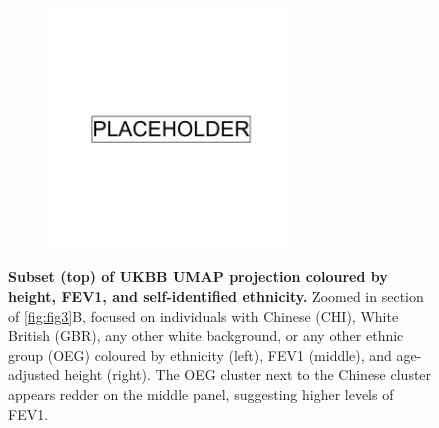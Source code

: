 \begin{figure}
    \centering
    \begin{subfigure}{\textwidth}
    \includegraphics[width=0.7\textwidth]{placeholder.png}
    \end{subfigure}
    \caption[Subset (top) of UKBB UMAP projection coloured by height, FEV1, and self-identified ethnicity]{\textbf{Subset (top) of UKBB UMAP projection coloured by height, FEV1, and self-identified ethnicity.} Zoomed in section of \ref{fig:fig3}B, focused on individuals with Chinese (CHI), White British (GBR), any other white background, or any other ethnic group (OEG) coloured by ethnicity (left), FEV1 (middle), and age-adjusted height (right). The OEG cluster next to the Chinese cluster appears redder on the middle panel, suggesting higher levels of FEV1.}
    \label{fig:supp_comparison_fev_chi_eur}
\end{figure}

\newpage

